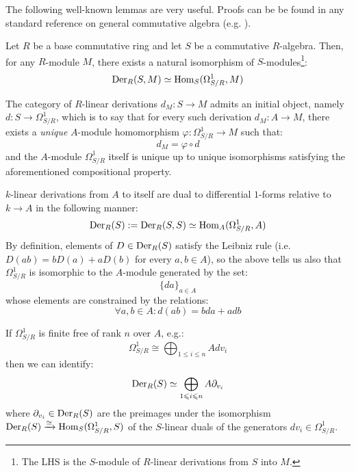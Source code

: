        The following well-known lemmas are very useful. Proofs can be be found in any standard reference on general commutative algebra (e.g. \cite[\href{https://stacks.math.columbia.edu/tag/00AO}{Tag 00AO}]{stacks}).
        \begin{lemma}
            \cite[\href{https://stacks.math.columbia.edu/tag/00RO}{Tag 00RO}]{stacks} Let $R$ be a base commutative ring and let $S$ be a commutative $R$-algebra. Then, for any $R$-module $M$, there exists a natural isomorphism of $S$-modules\footnote{The LHS is the $S$-module of $R$-linear derivations from $S$ into $M$.}:
                $$\mathrm{Der}_R(S, M) \simeq \mathrm{Hom}_S(\Omega^1_{S/R}, M)$$
        \end{lemma}
        \begin{corollary}
            The category of $R$-linear derivations $d_M: S \to M$ admits an initial object, namely $d: S \to \Omega^1_{S/R}$, which is to say that for every such derivation $d_M: A \to M$, there exists a \textit{unique} $A$-module homomorphism $\varphi: \Omega^1_{S/R} \to M$ such that:
                $$d_M = \varphi \circ d$$
            and the $A$-module $\Omega^1_{S/R}$ itself is unique up to unique isomorphisms satisfying the aforementioned compositional property.
        \end{corollary}
        \begin{corollary} \label{coro: 1_forms_are_dual_to_vector_fields}
            $k$-linear derivations from $A$ to itself are dual to differential $1$-forms relative to $k \to A$ in the following manner:
                $$\mathrm{Der}_R(S) := \mathrm{Der}_R(S, S) \simeq \mathrm{Hom}_A(\Omega^1_{S/R}, A)$$
            By definition, elements of $D \in \mathrm{Der}_R(S)$ satisfy the Leibniz rule (i.e. $D(ab) = b D(a) + a D(b)$ for every $a, b \in A$), so the above tells us also that $\Omega^1_{S/R}$ is isomorphic to the $A$-module generated by the set:
                $$\{da\}_{a \in A}$$
            whose elements are constrained by the relations:
                $$\forall a, b \in A: d(ab) = b da + a db$$
        \end{corollary}
        \begin{remark}
            If $\Omega^1_{S/R}$ is finite free of rank $n$ over $A$, e.g.:
                $$\Omega^1_{S/R} \cong \bigoplus_{1 \leq i \leq n} A dv_i$$
            then we can identify:
                $$\mathrm{Der}_R(S) \simeq \bigoplus_{1 \leqslant i \leqslant n} A \partial_{v_i}$$
            where $\partial_{v_i} \in \mathrm{Der}_R(S)$ are the preimages under the isomorphism $\mathrm{Der}_R(S) \xrightarrow[]{\simeq} \mathrm{Hom}_S(\Omega^1_{S/R}, S)$ of the $S$-linear duals of the generators $dv_i \in \Omega^1_{S/R}$. 
        \end{remark}
